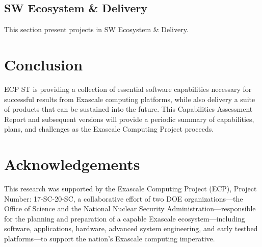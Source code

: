 \documentclass{ecpreport-publicv1}
\newcommand{\ecosystem}{SW Ecosystem \& Delivery}
\begin{document}
\subsection{\ecosystem}
This section present projects in \ecosystem.
\newpage

\newpage

\newpage

\newpage

\newpage

\newpage

\newpage


\newpage
\section{Conclusion}

ECP ST is providing a collection of essential software capabilities necessary for successful results from Exascale computing platforms, while also delivery a suite of products that can be sustained into the future.  This Capabilities Assessment Report and subsequent versions will provide a periodic summary of capabilities, plans, and challenges as the Exascale Computing Project proceeds.
\newpage
\section*{Acknowledgements}

This research was supported by the Exascale Computing Project (ECP), Project
Number: 17-SC-20-SC, a collaborative effort of two DOE organizations---the
Office of Science and the National Nuclear Security
Administration---responsible for the planning and preparation of a capable
Exascale ecosystem---including software, applications, hardware, advanced
system engineering, and early testbed platforms---to support the nation's
Exascale computing imperative.
\end{document}
